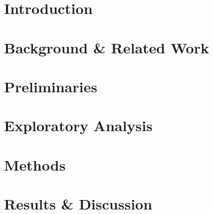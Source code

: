 \documentclass[sigconf]{acmart}
\begin{document}
\maketitle

\section{Introduction}
\label{sec:intro}


\section{Background \& Related Work}
\label{sec:related}
\vspace{-1mm}



\section{Preliminaries}
\label{sec:prelim}
\vspace{-1mm}



\section{Exploratory Analysis}
\label{sec:exploratory}
\vspace{-1mm}



\section{Methods}
\label{sec:methodology}
\vspace{-1mm}



\section{Results \& Discussion}
\label{sec:results-discuss}
\vspace{-1mm}

\end{document}
